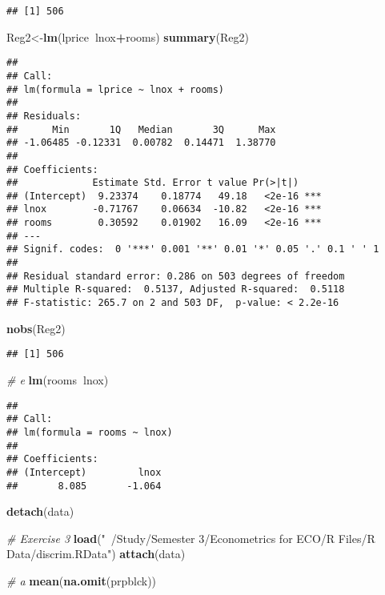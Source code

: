 \documentclass[]{article}
\newenvironment{Shaded}{\begin{snugshade}}{\end{snugshade}}
\newcommand{\CommentTok}[1]{\textcolor[rgb]{0.56,0.35,0.01}{\textit{#1}}}
\newcommand{\KeywordTok}[1]{\textcolor[rgb]{0.13,0.29,0.53}{\textbf{#1}}}
\newcommand{\NormalTok}[1]{#1}
\newcommand{\OperatorTok}[1]{\textcolor[rgb]{0.81,0.36,0.00}{\textbf{#1}}}
\newcommand{\StringTok}[1]{\textcolor[rgb]{0.31,0.60,0.02}{#1}}
\begin{document}
\begin{verbatim}
## [1] 506
\end{verbatim}

\begin{Shaded}
\begin{Highlighting}[]
\NormalTok{Reg2<-}\KeywordTok{lm}\NormalTok{(lprice}\OperatorTok{~}\NormalTok{lnox}\OperatorTok{+}\NormalTok{rooms)}
\KeywordTok{summary}\NormalTok{(Reg2)}
\end{Highlighting}
\end{Shaded}

\begin{verbatim}
## 
## Call:
## lm(formula = lprice ~ lnox + rooms)
## 
## Residuals:
##      Min       1Q   Median       3Q      Max 
## -1.06485 -0.12331  0.00782  0.14471  1.38770 
## 
## Coefficients:
##             Estimate Std. Error t value Pr(>|t|)    
## (Intercept)  9.23374    0.18774   49.18   <2e-16 ***
## lnox        -0.71767    0.06634  -10.82   <2e-16 ***
## rooms        0.30592    0.01902   16.09   <2e-16 ***
## ---
## Signif. codes:  0 '***' 0.001 '**' 0.01 '*' 0.05 '.' 0.1 ' ' 1
## 
## Residual standard error: 0.286 on 503 degrees of freedom
## Multiple R-squared:  0.5137, Adjusted R-squared:  0.5118 
## F-statistic: 265.7 on 2 and 503 DF,  p-value: < 2.2e-16
\end{verbatim}

\begin{Shaded}
\begin{Highlighting}[]
\KeywordTok{nobs}\NormalTok{(Reg2)}
\end{Highlighting}
\end{Shaded}

\begin{verbatim}
## [1] 506
\end{verbatim}

\begin{Shaded}
\begin{Highlighting}[]
\CommentTok{# e}
\KeywordTok{lm}\NormalTok{(rooms}\OperatorTok{~}\NormalTok{lnox)}
\end{Highlighting}
\end{Shaded}

\begin{verbatim}
## 
## Call:
## lm(formula = rooms ~ lnox)
## 
## Coefficients:
## (Intercept)         lnox  
##       8.085       -1.064
\end{verbatim}

\begin{Shaded}
\begin{Highlighting}[]
\KeywordTok{detach}\NormalTok{(data)}

\CommentTok{# Exercise 3}
\KeywordTok{load}\NormalTok{(}\StringTok{"~/Study/Semester 3/Econometrics for ECO/R Files/R Data/discrim.RData"}\NormalTok{)}
\KeywordTok{attach}\NormalTok{(data)}

\CommentTok{# a}
\KeywordTok{mean}\NormalTok{(}\KeywordTok{na.omit}\NormalTok{(prpblck))}
\end{Highlighting}
\end{Shaded}
\end{document}
